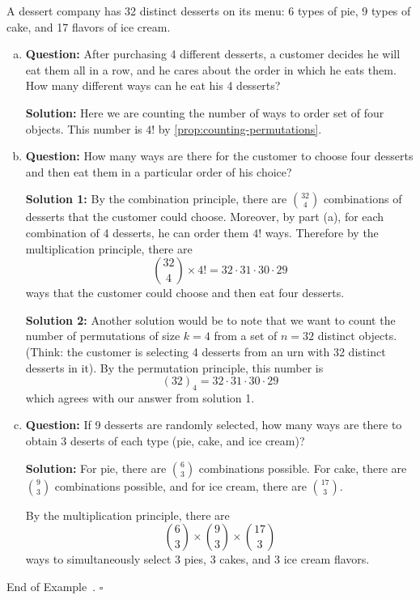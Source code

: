\documentclass[10pt]{article}
\theoremstyle{definition}
\newtheorem{example}[theorem]{Example}
\renewenvironment{example}
{\begin{oldexample}}
  {\par\smallskip\hfill   End of Example~\theexample. $\square$    \par\end{oldexample}}
\newcommand{\fl}{\noindent\textbf} %
\newcommand{\1}[1]{\textbf{1}_{\left[#1\right]}} %
\begin{document}
\begin{example}
  A dessert company has 32 distinct desserts on its menu: 6 types of pie, 9
  types of cake, and 17 flavors of ice cream.
  \begin{enumerate}[(a)]
    \item \textbf{Question:} After purchasing 4 different desserts, a customer decides he will
    eat them all in a row, and he cares about the order in which he eats them.
    How many different ways can he eat his 4 desserts?

    \textbf{Solution:} Here we are counting the number of ways to order
    set of four objects. This number is $4!$ by
    \cref{prop:counting-permutations}.
    
    \item \textbf{Question:} How many ways are there for the customer to choose
    four desserts and then eat them in a particular order of his choice?

    \textbf{Solution 1:} By the combination principle, there are ${32\choose 4}$
    combinations of desserts that the customer could choose. Moreover, by part
    (a), for each combination of 4 desserts, he can order them $4!$ ways.
    Therefore by the multiplication principle, there are
    \begin{equation*}
      {32\choose 4} \times 4! = 32\cdot 31\cdot 30\cdot 29
    \end{equation*}
    ways that the customer could choose and then eat four desserts.

    \textbf{Solution 2:} Another solution would be to note that we want to
    count the number of permutations of size $k=4$ from a set of $n=32$
    distinct objects. (Think: the customer is selecting 4 desserts from an urn
    with 32 distinct desserts in it). By the permutation principle, this
    number is
    \begin{equation*}
      (32)_{4} = 32\cdot 31\cdot30 \cdot29
    \end{equation*}
    which agrees with our answer from solution 1.

    \item \textbf{Question:} If 9 desserts are randomly selected, how many ways
    are there to obtain 3 deserts of each type (pie, cake, and ice cream)?

    \fl{Solution:} For pie, there are ${6\choose 3}$ combinations possible.
    For cake, there are ${9\choose 3}$ combinations possible, and for ice
    cream, there are ${17\choose 3}$.

    By the multiplication principle, there are
    \begin{equation*}
      {6\choose 3}\times {9\choose 3}\times {17\choose 3}
    \end{equation*}
    ways to simultaneously select 3 pies, 3 cakes, and 3 ice cream flavors.
  \end{enumerate}
\end{example}
\newpage
\end{document}
